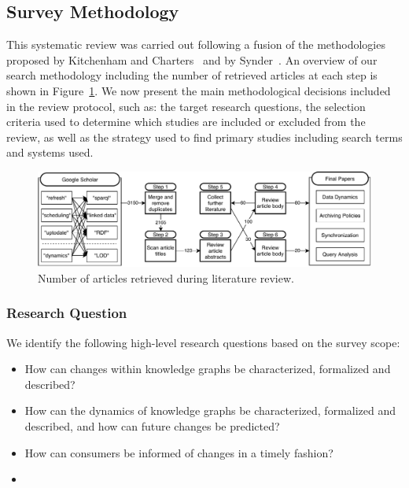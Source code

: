 \documentclass[sw]{iosart2x}
\begin{document}
\subsection{Survey Methodology}\label{Methodology}

This systematic review was carried out following a fusion of the methodologies proposed by Kitchenham and Charters~\cite{keele07} and by Synder~\cite{snyder19}. An overview of our search methodology including the number of retrieved articles at each step is shown in Figure~\ref{fig:methodology}. We now present the main methodological decisions included in the review protocol, such as: the target research questions, the selection criteria used to determine which studies are included or excluded from the review, as well as the strategy used to find primary studies including search terms and systems used. %




\begin{figure}[h]
	\centering
	\includegraphics[scale=0.8]{img/methodology.pdf}
	\caption{Number of articles retrieved during literature review.}
	\label{fig:methodology}
\end{figure}

\subsubsection{Research Question}\label{Question}

We identify the following high-level research questions based on the survey scope: 

\begin{itemize}
\item How can changes within knowledge graphs be characterized, formalized and described?
\item How can the dynamics of knowledge graphs be characterized, formalized and described, and how can future changes be predicted?
\item How can consumers be informed of changes in a timely fashion?
\item 
\end{itemize}
\end{document}
